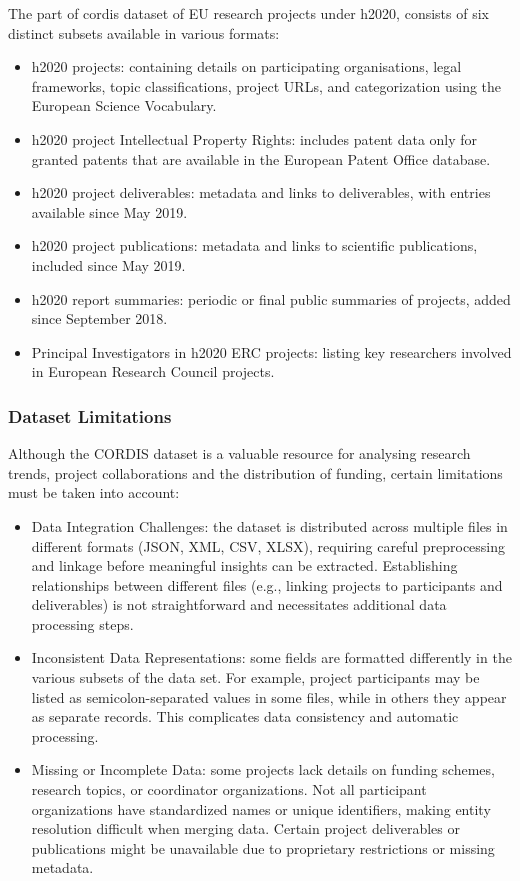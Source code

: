 The part of \gls{cordis} dataset of EU research projects under \gls{h2020}, consists of six distinct subsets available in various formats:
\begin{itemize}
    \item \gls{h2020} projects: containing details on participating organisations, legal frameworks, topic classifications, project URLs, and categorization using the European Science Vocabulary.
	\item \gls{h2020} project Intellectual Property Rights: includes patent data only for granted patents that are available in the European Patent Office database.
	\item \gls{h2020} project deliverables: metadata and links to deliverables, with entries available since May 2019.
	\item \gls{h2020} project publications: metadata and links to scientific publications, included since May 2019.
	\item \gls{h2020} report summaries: periodic or final public summaries of projects, added since September 2018.
	\item Principal Investigators in \gls{h2020} ERC projects: listing key researchers involved in European Research Council projects.
\end{itemize}

\subsubsection*{Dataset Limitations}
Although the CORDIS dataset is a valuable resource for analysing research trends, project collaborations and the distribution of funding, certain limitations must be taken into account:

\begin{itemize}
	\item Data Integration Challenges: the dataset is distributed across multiple files in different formats (JSON, XML, CSV, XLSX), requiring careful preprocessing and linkage before meaningful insights can be extracted.
	Establishing relationships between different files (e.g., linking projects to participants and deliverables) is not straightforward and necessitates additional data processing steps.
	\item Inconsistent Data Representations: some fields are formatted differently in the various subsets of the data set.
	For example, project participants may be listed as semicolon-separated values in some files, while in others they appear as separate records.
	This complicates data consistency and automatic processing.
	\item Missing or Incomplete Data: some projects lack details on funding schemes, research topics, or coordinator organizations.
	Not all participant organizations have standardized names or unique identifiers, making entity resolution difficult when merging data.
	Certain project deliverables or publications might be unavailable due to proprietary restrictions or missing metadata.
\end{itemize}